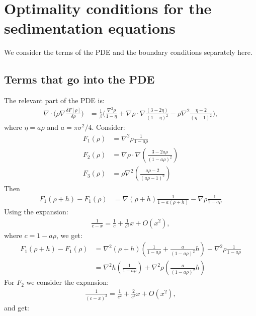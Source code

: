 \documentclass[11pt, a4paper]{article}
\theoremstyle{definition}
\begin{document}
	
\section{Optimality conditions for the sedimentation equations}
We consider the terms of the PDE and the boundary conditions separately here.
\subsection{Terms that go into the PDE}
The relevant part of the PDE is:
\begin{align*}
	\nabla \cdot \bigg(\rho \nabla \frac{\delta F[\rho]}{\delta \rho}\bigg)
	&= \frac{1}{\beta} \bigg( \frac{\nabla^2 \rho}{1 - \eta} +  \nabla \rho \cdot \nabla \frac{(3- 2 \eta)}{(1 - \eta)^2}  - \rho \nabla^2\frac{\eta - 2}{(\eta - 1)^2} \bigg),
\end{align*}
where $\eta = a \rho$ and $a = \pi \sigma^2 /4$.
Consider:
\begin{align*}
	F_1(\rho) &= \nabla^2 \rho \frac{1}{1- a\rho}\\
	F_2(\rho) &= \nabla \rho \cdot \nabla \left(\frac{3-2a\rho}{(1-a\rho)^2}\right)\\
	F_3(\rho) &= \rho \nabla^2 \left(\frac{a\rho -2}{(a\rho -1)^2}\right)
\end{align*}
Then
\begin{align*}
	F_1(\rho + h) - F_1(\rho) &= \nabla (\rho +h) \frac{1}{1- a(\rho +h)} - \nabla \rho \frac{1}{1- a\rho}
\end{align*}
Using the expansion: 
\begin{align*}
	\frac{1}{c - x} = \frac{1}{c} + \frac{1}{c^2}x + O(x^2),
\end{align*}
where $c = 1- a \rho$, we get:
\begin{align*}
	F_1(\rho + h) - F_1(\rho) &= \nabla^2 (\rho +h) \left(\frac{1}{1- a\rho} + \frac{a}{(1- a\rho)^2}h \right)- \nabla^2 \rho \frac{1}{1- a\rho}\\
	&= \nabla^2 h \left(\frac{1}{1- a\rho} \right) + \nabla^2 \rho \left(\frac{a}{(1- a\rho)^2}h\right)
\end{align*}
For $F_2$ we consider the expansion:
\begin{align*}
	\frac{1}{(c-x)^2} = \frac{1}{c^2} + \frac{2}{c^3}x + O(x^2),
\end{align*}
and get:
\end{document}
